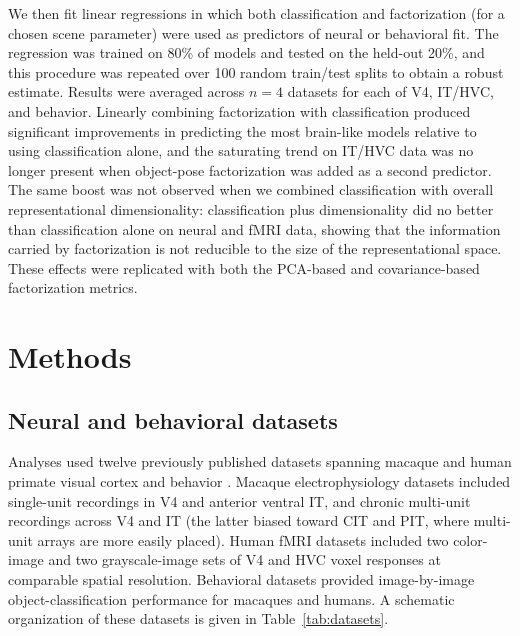 \documentclass[11pt]{article}
\begin{document}
We then fit linear regressions in which both classification and
factorization (for a chosen scene parameter) were used as predictors of
neural or behavioral fit. The regression was trained on 80\% of models and
tested on the held-out 20\%, and this procedure was repeated over 100
random train/test splits to obtain a robust estimate. Results were averaged
across \(n=4\) datasets for each of V4, IT/HVC, and behavior. Linearly
combining factorization with classification produced significant
improvements in predicting the most brain-like models relative to using
classification alone, and the saturating trend on IT/HVC data was no longer
present when object-pose factorization was added as a second predictor. The
same boost was not observed when we combined classification with overall
representational dimensionality: classification plus dimensionality did no
better than classification alone on neural and fMRI data, showing that the
information carried by factorization is not reducible to the size of the
representational space. These effects were replicated with both the PCA-based
and covariance-based factorization metrics.

\section{Methods}

\subsection{Neural and behavioral datasets}

Analyses used twelve previously published datasets spanning macaque and human
primate visual cortex and behavior
\citep{majaj2015simple, hong2016explicit, rajalingham2018large,
khalighrazavi2014deep}. Macaque electrophysiology datasets included
single-unit recordings in V4 and anterior ventral IT, and chronic multi-unit
recordings across V4 and IT (the latter biased toward CIT and PIT, where
multi-unit arrays are more easily placed). Human fMRI datasets included two
color-image and two grayscale-image sets of V4 and HVC voxel responses at
comparable spatial resolution. Behavioral datasets provided image-by-image
object-classification performance for macaques and humans. A schematic
organization of these datasets is given in Table~\ref{tab:datasets}.
\end{document}
